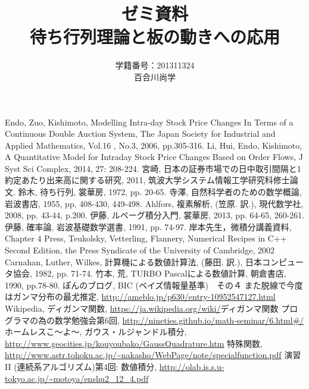 \documentclass[a4j,papersize,disablejfam,slide,14pt]{jsarticle}
\begin{document}
\title{\Huge ゼミ資料\\待ち行列理論と板の動きへの応用}
\author{\Large 学籍番号：201311324\\百合川尚学}
\maketitle

\tableofcontents

\begin{thebibliography}{9}
         {\rm Endo, Zuo, Kishimoto, 
        Modelling Intra-day Stock Price Changes In Terms of
        a Continuous Double Auction System, 
        The Japan Society for Industrial and Applied Mathematics, 
        Vol.16 , No.3, 2006, pp.305-316.}
         {\rm Li, Hui, Endo, Kishimoto, A Quantitative Model for Intraday Stock Price
         Changes Based on Order Flows, 
         J Syst Sci Complex, 2014, 27: 208-224.}
         {\rm 宮崎, 日本の証券市場での日中取引間隔と1約定あたり出来高に関する研究, 2011, 筑波大学システム情報工学研究科修士論文.}
         {\rm 鈴木, 待ち行列, 裳華房, 1972, pp. 20-65.}
         {\rm 寺澤, 自然科学者のための数学概論, 岩波書店, 1955, pp. 408-430, 449-498.}
         {\rm Ahlfors, 複素解析, (笠原. 訳.), 現代数学社, 2008, pp. 43-44, p.200.}
         {\rm 伊藤, ルベーグ積分入門, 裳華房, 2013, pp. 64-65, 260-261.}
         {\rm 伊藤, 確率論, 岩波基礎数学選書, 1991, pp. 74-97.}
         {\rm 岸本先生，微積分講義資料, Chapter 4}
         {\rm Press, Teukolsky, Vetterling, Flannery, Numerical Recipes in C++ Second Edition, the Press Syndicate of the University of Cambridge, 2002}
         {\rm Carnahan, Luther, Wilkes, 計算機による数値計算法, (藤田. 訳.), 日本コンピュータ協会, 1982, pp. 71-74.}
         {\rm 竹本, 荒, TURBO Pascalによる数値計算, 朝倉書店, 1990, pp.78-80.}
         {\rm ぽんのブログ, BIC (ベイズ情報量基準)　その４ また脱線で今度はガンマ分布の最尤推定, }\url{http://ameblo.jp/p630/entry-10952547127.html}
         {\rm Wikipedia, ディガンマ関数, }\url{https://ja.wikipedia.org/wiki/}{\rm ディガンマ関数}
         {\rm プログラマの為の数学勉強会第6回, }\url{http://nineties.github.io/math-seminar/6.html#/}
         {\rm ホームレスこ～よ～, ガウス・ルジャンドル積分, }\url{http://www.geocities.jp/kouyoubako/GaussQuadrature.htm}
         {\rm 特殊関数, }\url{http://www.astr.tohoku.ac.jp/~nakasho/WebPage/note/specialfunction.pdf}
         {\rm 演習II (連続系アルゴリズム)第4回: 数値積分, }\url{http://olab.is.s.u-tokyo.ac.jp/~motoya/enshu2_12_4.pdf}
        
\end{thebibliography}
\end{document}
